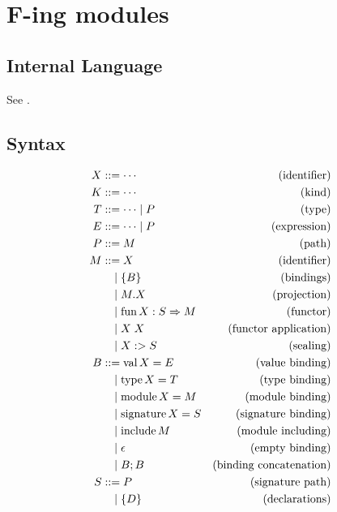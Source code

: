 \section{F-ing modules}

\cite{Rossberg:2014}

\subsection{Internal Language}

See .

\subsection{Syntax}

\begin{align*}
  X &\BNFassign \cdots &(\text{identifier}) \\
  K &\BNFassign \cdots &(\text{kind}) \\
  T &\BNFassign \cdots \mid P &(\text{type}) \\
  E &\BNFassign \cdots \mid P &(\text{expression}) \\
  P &\BNFassign M &(\text{path}) \\
  M
  &\BNFassign X &(\text{identifier}) \\
  &\BNFor \{ B \} &(\text{bindings}) \\
  &\BNFor M.X &(\text{projection}) \\
  &\BNFor \symfun X: S \Rightarrow M &(\text{functor}) \\
  &\BNFor X\; X &(\text{functor application}) \\
  &\BNFor X :> S &(\text{sealing}) \\
  B
  &\BNFassign \symval X = E &(\text{value binding}) \\
  &\BNFor \symtype X = T &(\text{type binding}) \\
  &\BNFor \symmodule X = M &(\text{module binding}) \\
  &\BNFor \symsignature X = S &(\text{signature binding}) \\
  &\BNFor \syminclude M &(\text{module including}) \\
  &\BNFor \epsilon &(\text{empty binding}) \\
  &\BNFor B; B &(\text{binding concatenation}) \\
  S
  &\BNFassign P &(\text{signature path}) \\
  &\BNFor \{ D \} &(\text{declarations}) \\

\end{align*}
